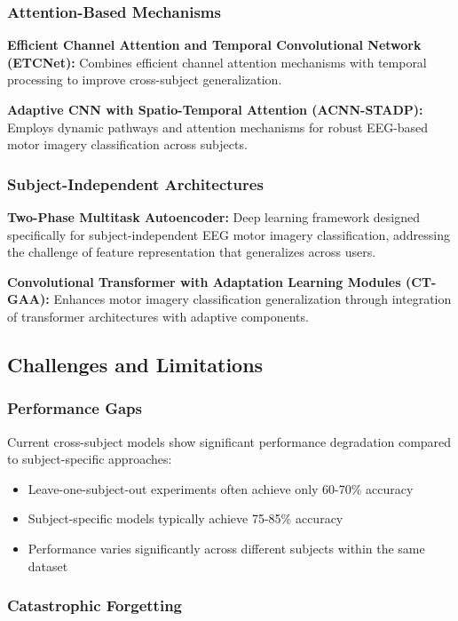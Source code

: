 \documentclass[12pt]{article}
\begin{document}
\subsubsection{Attention-Based Mechanisms}

\textbf{Efficient Channel Attention and Temporal Convolutional Network (ETCNet):} Combines efficient channel attention mechanisms with temporal processing to improve cross-subject generalization.

\textbf{Adaptive CNN with Spatio-Temporal Attention (ACNN-STADP):} Employs dynamic pathways and attention mechanisms for robust EEG-based motor imagery classification across subjects.

\subsubsection{Subject-Independent Architectures}

\textbf{Two-Phase Multitask Autoencoder:} Deep learning framework designed specifically for subject-independent EEG motor imagery classification, addressing the challenge of feature representation that generalizes across users.

\textbf{Convolutional Transformer with Adaptation Learning Modules (CT-GAA):} Enhances motor imagery classification generalization through integration of transformer architectures with adaptive components.

\subsection{Challenges and Limitations}

\subsubsection{Performance Gaps}

Current cross-subject models show significant performance degradation compared to subject-specific approaches:
\begin{itemize}
    \item Leave-one-subject-out experiments often achieve only 60-70\% accuracy
    \item Subject-specific models typically achieve 75-85\% accuracy
    \item Performance varies significantly across different subjects within the same dataset
\end{itemize}

\subsubsection{Catastrophic Forgetting}
\end{document}
